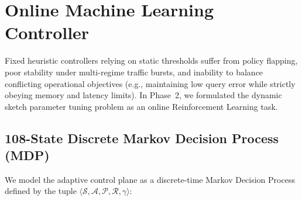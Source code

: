 \section{Online Machine Learning Controller}

Fixed heuristic controllers relying on static thresholds suffer from policy flapping, poor stability under multi-regime traffic bursts, and inability to balance conflicting operational objectives (e.g., maintaining low query error while strictly obeying memory and latency limits). In Phase~2, we formulated the dynamic sketch parameter tuning problem as an online Reinforcement Learning task.

\subsection{108-State Discrete Markov Decision Process (MDP)}
We model the adaptive control plane as a discrete-time Markov Decision Process defined by the tuple $\langle \mathcal{S}, \mathcal{A}, \mathcal{P}, \mathcal{R}, \gamma \rangle$:

